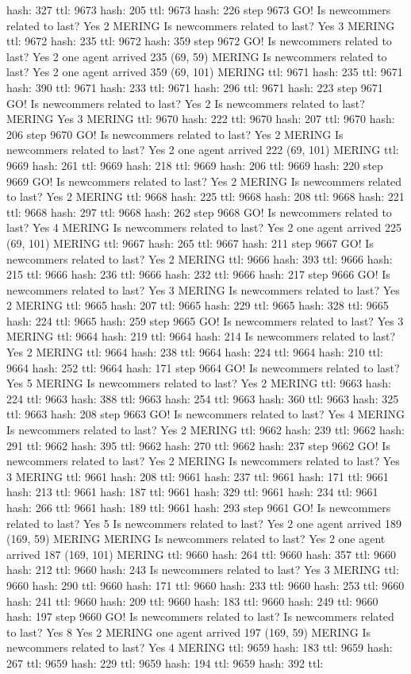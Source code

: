 hash: 327 ttl: 9673 hash: 205 ttl: 9673 hash: 226 step 9673 GO! Is newcommers related to last? Yes 2 MERING Is newcommers related to last? Yes 3 MERING ttl: 9672 hash: 235 ttl: 9672 hash: 359 step 9672 GO! Is newcommers related to last? Yes 2 one agent arrived 235 (69, 59) MERING Is newcommers related to last? Yes 2 one agent arrived 359 (69, 101) MERING ttl: 9671 hash: 235 ttl: 9671 hash: 390 ttl: 9671 hash: 233 ttl: 9671 hash: 296 ttl: 9671 hash: 223 step 9671 GO! Is newcommers related to last? Yes 2 Is newcommers related to last? MERING Yes 3 MERING ttl: 9670 hash: 222 ttl: 9670 hash: 207 ttl: 9670 hash: 206 step 9670 GO! Is newcommers related to last? Yes 2 MERING Is newcommers related to last? Yes 2 one agent arrived 222 (69, 101) MERING ttl: 9669 hash: 261 ttl: 9669 hash: 218 ttl: 9669 hash: 206 ttl: 9669 hash: 220 step 9669 GO! Is newcommers related to last? Yes 2 MERING Is newcommers related to last? Yes 2 MERING ttl: 9668 hash: 225 ttl: 9668 hash: 208 ttl: 9668 hash: 221 ttl: 9668 hash: 297 ttl: 9668 hash: 262 step 9668 GO! Is newcommers related to last? Yes 4 MERING Is newcommers related to last? Yes 2 one agent arrived 225 (69, 101) MERING ttl: 9667 hash: 265 ttl: 9667 hash: 211 step 9667 GO! Is newcommers related to last? Yes 2 MERING ttl: 9666 hash: 393 ttl: 9666 hash: 215 ttl: 9666 hash: 236 ttl: 9666 hash: 232 ttl: 9666 hash: 217 step 9666 GO! Is newcommers related to last? Yes 3 MERING Is newcommers related to last? Yes 2 MERING ttl: 9665 hash: 207 ttl: 9665 hash: 229 ttl: 9665 hash: 328 ttl: 9665 hash: 224 ttl: 9665 hash: 259 step 9665 GO! Is newcommers related to last? Yes 3 MERING ttl: 9664 hash: 219 ttl: 9664 hash: 214 Is newcommers related to last? Yes 2 MERING ttl: 9664 hash: 238 ttl: 9664 hash: 224 ttl: 9664 hash: 210 ttl: 9664 hash: 252 ttl: 9664 hash: 171 step 9664 GO! Is newcommers related to last? Yes 5 MERING Is newcommers related to last? Yes 2 MERING ttl: 9663 hash: 224 ttl: 9663 hash: 388 ttl: 9663 hash: 254 ttl: 9663 hash: 360 ttl: 9663 hash: 325 ttl: 9663 hash: 208 step 9663 GO! Is newcommers related to last? Yes 4 MERING Is newcommers related to last? Yes 2 MERING ttl: 9662 hash: 239 ttl: 9662 hash: 291 ttl: 9662 hash: 395 ttl: 9662 hash: 270 ttl: 9662 hash: 237 step 9662 GO! Is newcommers related to last? Yes 2 MERING Is newcommers related to last? Yes 3 MERING ttl: 9661 hash: 208 ttl: 9661 hash: 237 ttl: 9661 hash: 171 ttl: 9661 hash: 213 ttl: 9661 hash: 187 ttl: 9661 hash: 329 ttl: 9661 hash: 234 ttl: 9661 hash: 266 ttl: 9661 hash: 189 ttl: 9661 hash: 293 step 9661 GO! Is newcommers related to last? Yes 5 Is newcommers related to last? Yes 2 one agent arrived 189 (169, 59) MERING MERING Is newcommers related to last? Yes 2 one agent arrived 187 (169, 101) MERING ttl: 9660 hash: 264 ttl: 9660 hash: 357 ttl: 9660 hash: 212 ttl: 9660 hash: 243 Is newcommers related to last? Yes 3 MERING ttl: 9660 hash: 290 ttl: 9660 hash: 171 ttl: 9660 hash: 233 ttl: 9660 hash: 253 ttl: 9660 hash: 241 ttl: 9660 hash: 209 ttl: 9660 hash: 183 ttl: 9660 hash: 249 ttl: 9660 hash: 197 step 9660 GO! Is newcommers related to last? Is newcommers related to last? Yes 8 Yes 2 MERING one agent arrived 197 (169, 59) MERING Is newcommers related to last? Yes 4 MERING ttl: 9659 hash: 183 ttl: 9659 hash: 267 ttl: 9659 hash: 229 ttl: 9659 hash: 194 ttl: 9659 hash: 392 ttl: 
